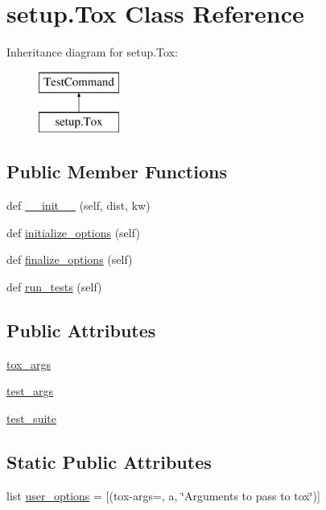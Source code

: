 \hypertarget{classsetup_1_1_tox}{}\section{setup.\+Tox Class Reference}
\label{classsetup_1_1_tox}
Inheritance diagram for setup.\+Tox\+:\begin{figure}[H]
\begin{center}
\leavevmode
\includegraphics[height=2.000000cm]{classsetup_1_1_tox}
\end{center}
\end{figure}
\subsection*{Public Member Functions}
\begin{DoxyCompactItemize}
\item 
def \hyperlink{classsetup_1_1_tox_a159692462d94cd3b4baae75e26971c73}{\+\_\+\+\_\+init\+\_\+\+\_\+} (self, dist, kw)
\item 
def \hyperlink{classsetup_1_1_tox_aac0c8e14e51810383bcd4ec74d9f204b}{initialize\+\_\+options} (self)
\item 
def \hyperlink{classsetup_1_1_tox_a1cbe599935826256c44168aa052f7f33}{finalize\+\_\+options} (self)
\item 
def \hyperlink{classsetup_1_1_tox_a300d28131f173af7c0db7f5d284ae569}{run\+\_\+tests} (self)
\end{DoxyCompactItemize}
\subsection*{Public Attributes}
\begin{DoxyCompactItemize}
\item 
\hyperlink{classsetup_1_1_tox_ac08f63adccecb66e89573fd7d30dcd33}{tox\+\_\+args}
\item 
\hyperlink{classsetup_1_1_tox_a59158127695b4f7b88100af0d4fa80be}{test\+\_\+args}
\item 
\hyperlink{classsetup_1_1_tox_a32ec135eb310f1163a08216990c10564}{test\+\_\+suite}
\end{DoxyCompactItemize}
\subsection*{Static Public Attributes}
\begin{DoxyCompactItemize}
\item 
list \hyperlink{classsetup_1_1_tox_a3fd5640153f8f13c889183193d742ae0}{user\+\_\+options} = \mbox{[}(\textquotesingle{}tox-\/args=\textquotesingle{}, \textquotesingle{}a\textquotesingle{}, \char`\"{}Arguments to pass to tox\char`\"{})\mbox{]}
\end{DoxyCompactItemize}


